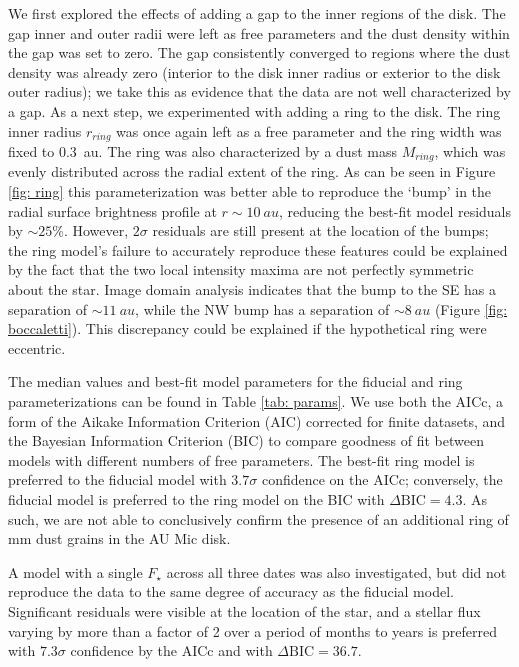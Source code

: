 \documentclass[modern]{aastex62}
\begin{document}
We first explored the effects of adding a gap  to the inner regions of the disk. 
The gap inner and outer radii were left as free parameters and the dust density within the gap was set to zero.
The gap consistently converged to regions where the dust density was already zero (interior to the disk inner radius or exterior to the disk outer radius); we take this as evidence that the data are not well characterized by a gap.
As a next step, we experimented with adding a ring to the disk. 
The ring inner radius $r_{ring}$ was once again left as a free parameter and the ring width was fixed to \SI{0.3}{au}.
The ring was also characterized by a dust mass $M_{ring}$, which was evenly distributed across the radial extent of the ring. 
As can be seen in Figure \ref{fig: ring} this parameterization was better able to reproduce the `bump' in the radial surface brightness profile at $r \sim \SI{10}{au}$, reducing the best-fit model residuals by $\sim 25 \%$. 
However, $2 \sigma$ residuals are still present at the location of the bumps; the ring model's failure to accurately reproduce these features could be explained by the fact that the two local intensity maxima are not perfectly symmetric about the star. 
Image domain analysis indicates that the bump to the SE has a separation of $\sim \SI{11}{au}$, while the NW bump has a separation of $\sim \SI{8}{au}$  (Figure \ref{fig: boccaletti}). 
This discrepancy could be explained if the hypothetical ring were eccentric.

The median values and best-fit model parameters for the fiducial and ring parameterizations can be found in Table \ref{tab: params}. 
We use both the AICc, a form of the Aikake Information Criterion (AIC) corrected for finite datasets, and the Bayesian Information Criterion (BIC) to compare goodness of fit between models with different numbers of free parameters.  
The best-fit ring model is preferred to the fiducial model with $3.7 \sigma$ confidence on the AICc; conversely, the fiducial model is preferred to the ring model on the BIC with $\Delta \text{BIC} = 4.3$.
As such, we are not able to conclusively confirm the presence of an additional ring of mm dust grains in the AU Mic disk.

A model with a single $F_\star$ across all three dates was also investigated, but did not reproduce the data to the same degree of accuracy as the fiducial model.
Significant residuals were visible at the location of the star, and  a stellar flux varying by more than a factor of 2 over a period of months to years is preferred with $7.3 \sigma$ confidence by the AICc and with $\Delta \text{BIC} = 36.7$.
\end{document}
